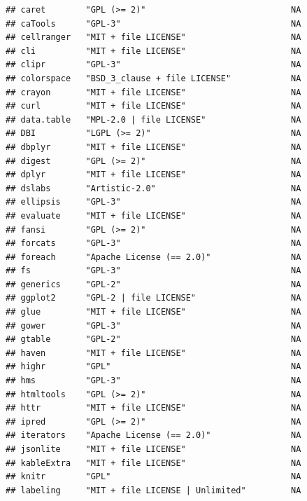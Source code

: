 \documentclass[]{article}
\begin{document}
\begin{verbatim}
## caret        "GPL (>= 2)"                             NA             
## caTools      "GPL-3"                                  NA             
## cellranger   "MIT + file LICENSE"                     NA             
## cli          "MIT + file LICENSE"                     NA             
## clipr        "GPL-3"                                  NA             
## colorspace   "BSD_3_clause + file LICENSE"            NA             
## crayon       "MIT + file LICENSE"                     NA             
## curl         "MIT + file LICENSE"                     NA             
## data.table   "MPL-2.0 | file LICENSE"                 NA             
## DBI          "LGPL (>= 2)"                            NA             
## dbplyr       "MIT + file LICENSE"                     NA             
## digest       "GPL (>= 2)"                             NA             
## dplyr        "MIT + file LICENSE"                     NA             
## dslabs       "Artistic-2.0"                           NA             
## ellipsis     "GPL-3"                                  NA             
## evaluate     "MIT + file LICENSE"                     NA             
## fansi        "GPL (>= 2)"                             NA             
## forcats      "GPL-3"                                  NA             
## foreach      "Apache License (== 2.0)"                NA             
## fs           "GPL-3"                                  NA             
## generics     "GPL-2"                                  NA             
## ggplot2      "GPL-2 | file LICENSE"                   NA             
## glue         "MIT + file LICENSE"                     NA             
## gower        "GPL-3"                                  NA             
## gtable       "GPL-2"                                  NA             
## haven        "MIT + file LICENSE"                     NA             
## highr        "GPL"                                    NA             
## hms          "GPL-3"                                  NA             
## htmltools    "GPL (>= 2)"                             NA             
## httr         "MIT + file LICENSE"                     NA             
## ipred        "GPL (>= 2)"                             NA             
## iterators    "Apache License (== 2.0)"                NA             
## jsonlite     "MIT + file LICENSE"                     NA             
## kableExtra   "MIT + file LICENSE"                     NA             
## knitr        "GPL"                                    NA             
## labeling     "MIT + file LICENSE | Unlimited"         NA             

\end{verbatim}
\end{document}
